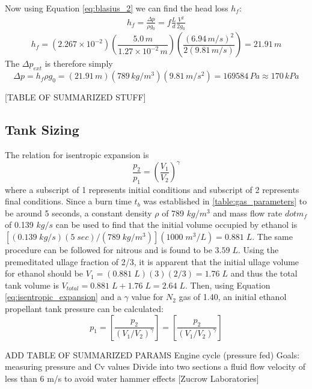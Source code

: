 \documentclass[9pt]{article} %
\numberwithin{equation}{section} %
\begin{document}
Now using Equation \ref{eq:blasius_2} we can find the head loss $h_{f}$:
\begin{align*}
h_{f} = \frac{\Delta p}{\rho g_{0}} = f \frac{L}{d} \frac{V^{2}}{2g_{0}}
\end{align*}
\begin{equation}
h_{f} = (2.267 \times 10^{-2}) \left( \frac{5.0\, m}{1.27 \times 10^{-2}\, m} \right) \left( \frac{(6.94\, m/s)^{2}}{2 (9.81\, m/s)} \right) = 21.91 \, m
\end{equation}
The $\Delta p_{ext}$ is therefore simply
\begin{equation}
\Delta p = h_{f} \rho g_{0} = (21.91 \, m)(789 \, kg/m^{3})(9.81 \, m/s^{2}) = 169584 \, Pa \approx 170 \, kPa
\end{equation}

[TABLE OF SUMMARIZED STUFF]

\subsection{Tank Sizing}

The relation for isentropic expansion is
\begin{equation} \label{eq:isentropic_expansion}
\frac{p_{2}}{p_{1}} = \left( \frac{V_{1}}{V_{2}} \right) ^{\gamma}
\end{equation}
where a subscript of 1 represents initial conditions and subscript of 2 represents final conditions. Since a burn time $t_{b}$ was established in \ref{table:gas_parameters} to be around 5 seconds, a constant density $\rho$ of 789 $kg/m^{3}$ and mass flow rate $dot{m}_{f}$ of 0.139 $kg/s$ can be used to find that the initial volume occupied by ethanol is $[(0.139 \; kg/s)(5 \; sec)/(789 \; kg/m^{3})](1000 \; m^{3}/L) = 0.881 \; L$. The same procedure can be followed for nitrous and is found to be $3.59 \; L$. Using the premeditated ullage fraction of 2/3, it is apparent that the initial ullage volume for ethanol should be $V_{1} = (0.881 \; L)(3)(2/3) = 1.76 \; L$ and thus the total tank volume is $V_{total} = 0.881 \; L + 1.76 \; L = 2.64 \; L$. Then, using Equation \ref{eq:isentropic_expansion} and a $\gamma$ value for $N_{2}$ gas of 1.40,  an initial ethanol propellant tank pressure can be calculated:
\begin{equation*}
p_{1} = \left[ \frac{p_{2}}{(V_{1}/V_{2})^{\gamma}} \right] = \left[ \frac{p_{2}}{(V_{1}/V_{2})^{\gamma}} \right]
\end{equation*}

ADD TABLE OF SUMMARIZED PARAMS
Engine cycle (pressure fed)
Goals: measuring pressure and Cv values
Divide into two sections
a fluid flow velocity of less than 6 m/s to avoid water hammer effects [Zucrow Laboratories]
\end{document}
